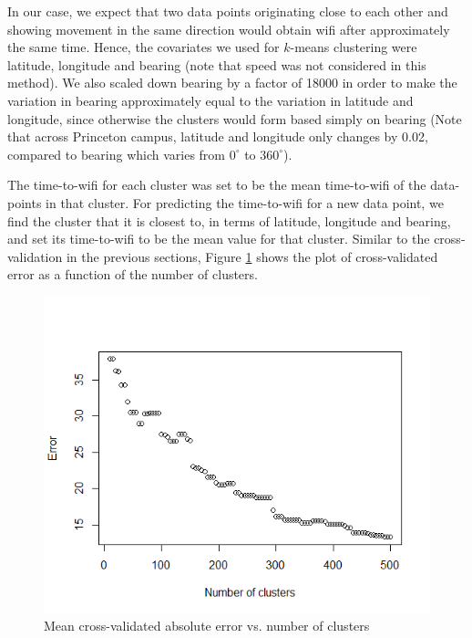 \documentclass[12pt, fleqn]{article}
\begin{document}
In our case, we expect that two data points originating close 
to each other and showing movement in the same direction would obtain wifi after 
approximately the same time. Hence, the covariates we used for $k$-means 
clustering were latitude, longitude and bearing (note that speed was not 
considered in this method). We also scaled down bearing by a factor of 18000 in 
order to make the variation in bearing approximately equal to the variation in latitude 
and longitude, since otherwise the clusters would form based simply on bearing (Note that 
across Princeton campus, latitude and longitude only changes by 0.02, compared 
to bearing which varies from $0^\circ$ to $360^\circ$). 

The time-to-wifi for each cluster was set to be the mean time-to-wifi of the data-points in 
that cluster. For predicting the time-to-wifi for a new data point, we find the cluster that it is
closest to, in terms of latitude, longitude and bearing, and set its 
time-to-wifi to be the mean value for that cluster. Similar to the cross-validation
in the previous sections, Figure \ref{fig-num-clusters} shows the plot of 
cross-validated error as a function of the number of clusters. 

\medskip
\begin{figure}[htp]
\centering
\includegraphics[scale=0.5]{img/num_clusters.png}
\caption{Mean cross-validated absolute error vs. number of clusters\label{fig-num-clusters}}
\end{figure}
\medskip
\end{document}
